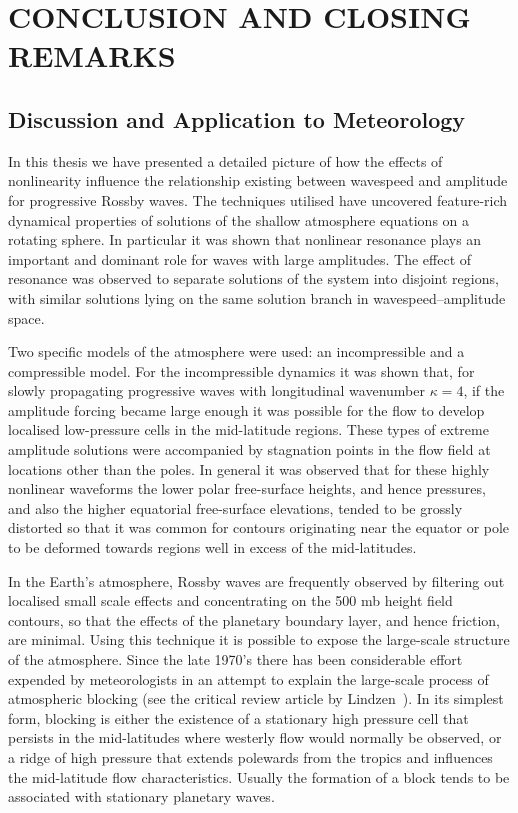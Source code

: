 
\chapter[CONCLUSION AND CLOSING REMARKS]{CONCLUSION AND CLOSING REMARKS}
\label{chap:6}
\section{Discussion and Application to Meteorology}
In this thesis we have presented a detailed picture of how the effects of nonlinearity influence the relationship existing between wavespeed and amplitude for progressive Rossby waves. The techniques utilised have uncovered feature-rich dynamical properties of solutions of the shallow 
atmosphere equations on a rotating sphere. In particular it was shown that nonlinear resonance plays an important and dominant role for waves with large amplitudes. The effect of resonance was observed to separate solutions of the system into disjoint regions, with similar solutions lying on the same solution branch in wavespeed--amplitude space.

Two specific models of the atmosphere were used: an incompressible and a compressible model. For the incompressible dynamics it was shown that, for slowly propagating progressive waves with longitudinal wavenumber $\kappa=4$, if the amplitude forcing became large enough it was possible for the flow to develop localised low-pressure cells in the mid-latitude regions. These types of extreme amplitude solutions were accompanied by stagnation points in the flow field at locations other than the poles. In general it was observed that for these highly nonlinear waveforms the lower polar free-surface heights, and hence pressures, and also the higher equatorial free-surface elevations, tended to be grossly distorted so that it was common for contours originating near the equator or pole to be deformed towards regions well in excess of the mid-latitudes.

In the Earth's atmosphere, Rossby waves are frequently observed by filtering out localised small scale effects and concentrating on the 500 mb height field contours, so that the effects of the planetary boundary layer, and hence friction, are minimal. Using this technique it is possible to expose the large-scale structure of the atmosphere. Since the late 1970's there has been considerable effort expended by meteorologists in an attempt to explain the large-scale process of atmospheric blocking (see the critical review article by Lindzen~\cite{Lindzen:SPW}). In its simplest form, blocking is either the existence of a stationary high pressure cell that persists in the mid-latitudes where westerly flow would normally be observed, or a ridge of high pressure that extends polewards from the tropics and influences the mid-latitude flow characteristics. Usually the formation of a block tends to be associated with stationary planetary waves.  

